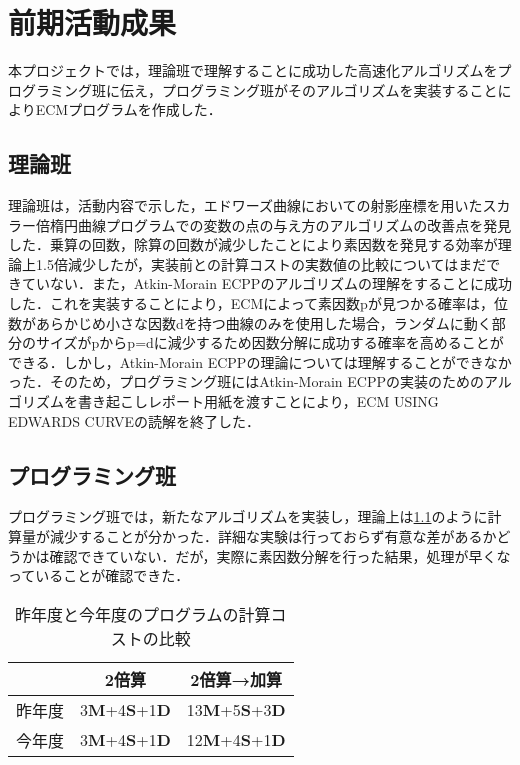 \documentclass[openany,11pt,papersize]{jsbook}
\begin{document}
{\begin{itemize}
\end{itemize}


\chapter{前期活動成果}


本プロジェクトでは，理論班で理解することに成功した高速化アルゴリズムをプログラミング班に伝え，プログラミング班がそのアルゴリズムを実装することによりECMプログラムを作成した．


\section{理論班}

理論班は，活動内容で示した，エドワーズ曲線においての射影座標を用いたスカラー倍楕円曲線プログラムでの変数の点の与え方のアルゴリズムの改善点を発見した．乗算の回数，除算の回数が減少したことにより素因数を発見する効率が理論上1.5倍減少したが，実装前との計算コストの実数値の比較についてはまだできていない．また，Atkin-Morain ECPPのアルゴリズムの理解をすることに成功した．これを実装することにより，ECMによって素因数pが見つかる確率は，位数があらかじめ小さな因数dを持つ曲線のみを使用した場合，ランダムに動く部分のサイズがpからp=dに減少するため因数分解に成功する確率を高めることができる．しかし，Atkin-Morain ECPPの理論については理解することができなかった．そのため，プログラミング班にはAtkin-Morain ECPPの実装のためのアルゴリズムを書き起こしレポート用紙を渡すことにより，ECM USING EDWARDS CURVEの読解を終了した．


\section{プログラミング班}
プログラミング班では，新たなアルゴリズムを実装し，理論上は\ref{tab:cost}のように計算量が減少することが分かった．詳細な実験は行っておらず有意な差があるかどうかは確認できていない．だが，実際に素因数分解を行った結果，処理が早くなっていることが確認できた．

\begin{table}
\begin{center}
\caption{昨年度と今年度のプログラムの計算コストの比較}\label{tab:cost}
\begin{tabular}{ccc}
\hline
& 2倍算 & 2倍算→加算\\
\hline
昨年度 & 3{\bf M}+4{\bf S}+1{\bf D}\footnotemark & 13{\bf M}+5{\bf S}+3{\bf D}\\
今年度 & 3{\bf M}+4{\bf S}+1{\bf D} & 12{\bf M}+4{\bf S}+1{\bf D}\\
\hline
\end{tabular}
\end{center}
\end{table}

}
\end{document}
